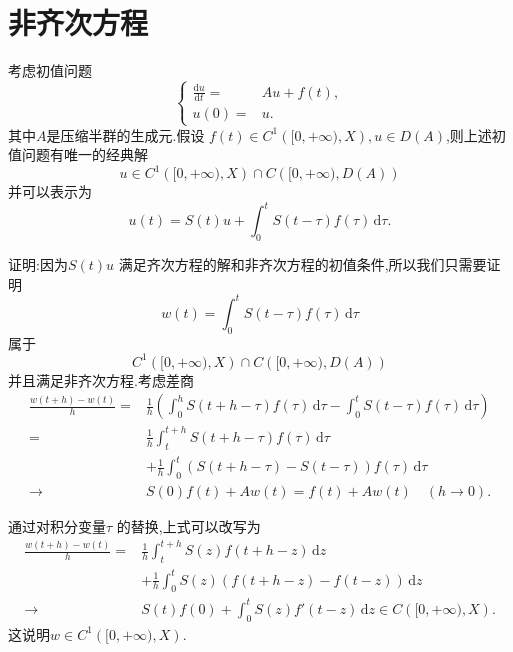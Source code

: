 \section{非齐次方程}

  \begin{theorem}
    考虑初值问题
    \begin{equation}
      \left\{
	\begin{aligned}
	  \frac{\mathrm{d}u}{\mathrm{d}t}=&Au+f(t),\\
	  u(0)=&u.
	\end{aligned}
	\right.
    \end{equation}
    其中$A$是压缩半群的生成元.假设 $f(t)\in C^{1}\left( [0,+\infty),X \right) ,u\in D(A)$,则上述初值问题有唯一的经典解
    \[
      u\in C^{1}\left( [0,+\infty),X \right) \cap C\left( [0,+\infty),D(A) \right)  
    \] 
    并可以表示为
    \begin{equation}\label{41}
      u(t)=S(t)u+\int_0^{t}S(t-\tau )f(\tau )\,\mathrm{d}\tau .
    \end{equation}
  \end{theorem}


  证明:因为$S(t)u$ 满足齐次方程的解和非齐次方程的初值条件,所以我们只需要证明
  \[
    w(t)=\int_0^{t}S(t-\tau )f(\tau )\,\mathrm{d}\tau 
  \] 
  属于
  \[
    C^{1}\left( [0,+\infty),X \right) \cap C\left( [0,+\infty),D(A) \right) 
  \] 
  并且满足非齐次方程.考虑差商
  \begin{equation}
    \begin{aligned}
      \frac{w(t+h)-w(t)}{h}=& \frac{1}{h}\left( \int_0^{h}S(t+h-\tau )f(\tau )\,\mathrm{d}\tau -\int_0^{t}S(t-\tau )f(\tau )\,\mathrm{d}\tau  \right) \\
      = & \frac{1}{h}\int_t ^{t+h}S\left( t+h-\tau  \right) f(\tau )\,\mathrm{d}\tau \\
      &+\frac{1}{h}\int_0^{t}\left( S(t+h-\tau )-S(t-\tau ) \right) f(\tau )\,\mathrm{d}\tau\\
      \to & S(0)f(t)+Aw(t)=f(t)+Aw(t)\quad\left( h\to 0 \right) .
    \end{aligned}
  \end{equation}

  通过对积分变量$\tau $ 的替换,上式可以改写为
  \begin{equation}
    \begin{aligned}
    \frac{w(t+h)-w(t)}{h}=& \frac{1}{h}\int_t ^{t+h}S(z)f(t+h-z)\,\mathrm{d}z\\
    &+\frac{1}{h}\int_0^{t}S(z)\left( f(t+h-z)-f(t-z) \right) \,\mathrm{d}z\\
    \to & S(t) f(0)+\int_0^{t}S(z)f'(t-z)\,\mathrm{d}z\in C\left( [0,+\infty),X \right) .
    \end{aligned}
  \end{equation}
  这说明$w\in C^{1}\left( [0,+\infty),X \right) $.

